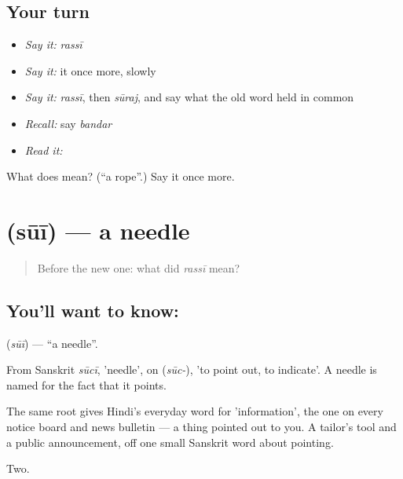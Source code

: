 \subsection*{Your turn}
\begin{itemize}
\raggedright
  \item \emph{Say it:} \emph{rassī}
  \item \emph{Say it:} it once more, slowly
  \item \emph{Say it:} \emph{rassī}, then \emph{sūraj}, and say what the old word held in common
  \item \emph{Recall:} say \emph{bandar}
  \item \emph{Read it:} \textbf{}
\end{itemize}

\begin{tcolorbox}[breakable,colback=teal!4,colframe=teal!35!black,title={Before you move on}]
What does  mean? (\textquotedblleft{}a rope\textquotedblright{}.) Say it once more.
\end{tcolorbox}
\section[\texorpdfstring{\hi{सूई} (sūī)}{सूई (sūī)}]{ (sūī) — a needle}

\label{lesson:HI-C62-needle}



\begin{quote}
Before the new one: what did \emph{rassī} mean?
\end{quote}

\subsection*{You'll want to know: }
\textbf{} (\emph{sūī}) — \textquotedblleft{}a needle\textquotedblright{}.

From Sanskrit \emph{sūcī}, 'needle', on  (\emph{sūc-}), 'to point out, to indicate'. A needle is named for the fact that it points.

The same root gives Hindi's everyday word for 'information', the one on every notice board and news bulletin — a thing pointed out to you. A tailor's tool and a public announcement, off one small Sanskrit word about pointing.

\begin{grammarlens}[title={What you've built}]
Two.
\end{grammarlens}

